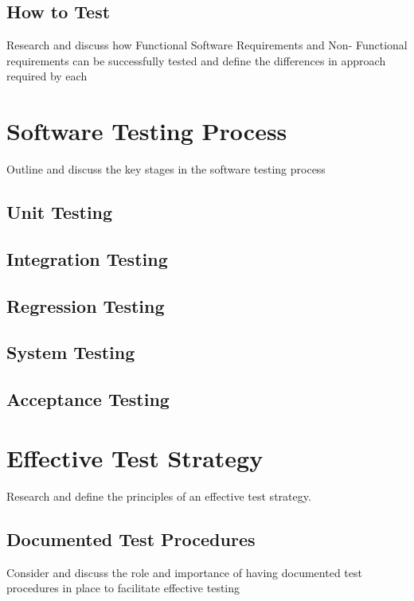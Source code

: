 \documentclass[12pt]{article}
\begin{document}
\subsection{How to Test}
Research and discuss how Functional Software Requirements and Non- Functional requirements can be successfully tested and define the differences in approach required by each



\section{Software Testing Process}
Outline and discuss the key stages in the software testing process

\subsection{Unit Testing}

\subsection{Integration Testing}

\subsection{Regression Testing}

\subsection{System Testing}

\subsection{Acceptance Testing}



\section{Effective Test Strategy}
Research and define the principles of an effective test strategy.

\subsection{Documented Test Procedures}
Consider and discuss the role and importance of having documented test procedures in place to facilitate effective testing
\end{document}
